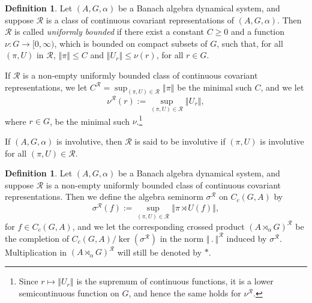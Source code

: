 \documentclass{amsart}
\theoremstyle{plain}
\theoremstyle{definition}
\newtheorem{defn}[theorem]{Definition}
\numberwithin{equation}{section}
\begin{document}
\begin{defn}\label{d:uniformly_bounded_class}
Let ${(A,G,\alpha)}$ be a Banach algebra dynamical system, and suppose ${\mathcal R}$ is a class of continuous covariant representations of ${(A,G,\alpha)}$. Then ${\mathcal R}$ is called \emph{uniformly bounded} if there exist a constant $C \geq 0$ and a function $\nu:G\to[0,\infty)$, which is bounded on compact subsets of $G$, such that, for all ${(\pi,U)}$ in ${\mathcal R}$, ${\left\Vert {\pi} \right\Vert} \leq C$ and ${\left\Vert {U_r} \right\Vert}\leq \nu(r)$, for all $r \in G$.

If ${\mathcal R}$ is a non-empty uniformly bounded class of continuous covariant representations, we let ${{C^{\mathcal R}}} = \sup_{{(\pi,U)}\in{\mathcal R}}{\left\Vert {\pi} \right\Vert}$ be the minimal such $C$, and we let
\begin{equation}\label{e:nur_definition}
{\nu^{\mathcal R}}(r):=\sup_{{(\pi,U)} \in {\mathcal R}} {\left\Vert {U_r} \right\Vert},                                                                                                                      \end{equation}
where $r\in G$, be the minimal such $\nu$.\footnote{Since $r\mapsto{\left\Vert {U_r} \right\Vert}$ is the supremum of continuous functions, it is a lower semicontinuous function on $G$, and hence the same holds for ${\nu^{\mathcal R}}$.}

If ${(A,G,\alpha)}$ is involutive, then ${\mathcal R}$ is said to be involutive if ${(\pi,U)}$ is involutive for all ${(\pi,U)}\in{\mathcal R}$.
\end{defn}

\begin{defn}\label{d:crossed_product}
Let ${(A,G,\alpha)}$ be a Banach algebra dynamical system, and suppose ${\mathcal R}$ is a non-empty uniformly bounded class of continuous covariant representations. Then we define the algebra seminorm ${\sigma^{\mathcal R}}$ on $C_c(G,A)$ by
\begin{equation*}
{\sigma^{\mathcal R}}(f) := \sup_{{(\pi,U)} \in {\mathcal R}} {\left\Vert {{\pi \rtimes U}(f)} \right\Vert},
\end{equation*}
for $f\in C_c(G,A)$, and we let the corresponding crossed product ${(A {\rtimes}_\alpha G)^\mathcal{R}}$ be the completion of $C_c(G,A)/\ker({\sigma^{\mathcal R}})$ in the norm ${\left\Vert {\,.\,} \right\Vert^{\mathcal R}}$ induced by ${\sigma^{\mathcal R}}$. Multiplication in ${(A {\rtimes}_\alpha G)^\mathcal{R}}$ will still be denoted by $*$.
\end{defn}
\end{document}
